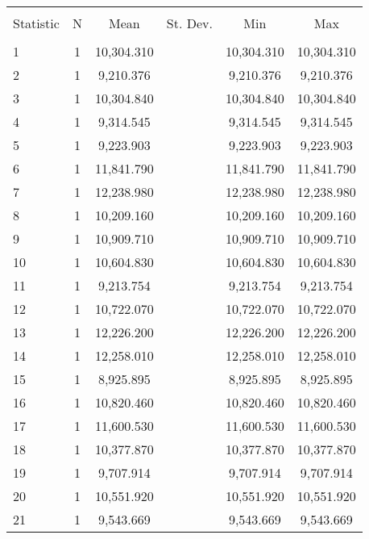 
\begin{table}[!htbp] \centering 
  \caption{} 
  \label{} 
\begin{tabular}{@{\extracolsep{5pt}}lccccc} 
\\[-1.8ex]\hline 
\hline \\[-1.8ex] 
Statistic & \multicolumn{1}{c}{N} & \multicolumn{1}{c}{Mean} & \multicolumn{1}{c}{St. Dev.} & \multicolumn{1}{c}{Min} & \multicolumn{1}{c}{Max} \\ 
\hline \\[-1.8ex] 
1 & 1 & 10,304.310 &  & 10,304.310 & 10,304.310 \\ 
2 & 1 & 9,210.376 &  & 9,210.376 & 9,210.376 \\ 
3 & 1 & 10,304.840 &  & 10,304.840 & 10,304.840 \\ 
4 & 1 & 9,314.545 &  & 9,314.545 & 9,314.545 \\ 
5 & 1 & 9,223.903 &  & 9,223.903 & 9,223.903 \\ 
6 & 1 & 11,841.790 &  & 11,841.790 & 11,841.790 \\ 
7 & 1 & 12,238.980 &  & 12,238.980 & 12,238.980 \\ 
8 & 1 & 10,209.160 &  & 10,209.160 & 10,209.160 \\ 
9 & 1 & 10,909.710 &  & 10,909.710 & 10,909.710 \\ 
10 & 1 & 10,604.830 &  & 10,604.830 & 10,604.830 \\ 
11 & 1 & 9,213.754 &  & 9,213.754 & 9,213.754 \\ 
12 & 1 & 10,722.070 &  & 10,722.070 & 10,722.070 \\ 
13 & 1 & 12,226.200 &  & 12,226.200 & 12,226.200 \\ 
14 & 1 & 12,258.010 &  & 12,258.010 & 12,258.010 \\ 
15 & 1 & 8,925.895 &  & 8,925.895 & 8,925.895 \\ 
16 & 1 & 10,820.460 &  & 10,820.460 & 10,820.460 \\ 
17 & 1 & 11,600.530 &  & 11,600.530 & 11,600.530 \\ 
18 & 1 & 10,377.870 &  & 10,377.870 & 10,377.870 \\ 
19 & 1 & 9,707.914 &  & 9,707.914 & 9,707.914 \\ 
20 & 1 & 10,551.920 &  & 10,551.920 & 10,551.920 \\ 
21 & 1 & 9,543.669 &  & 9,543.669 & 9,543.669 \\ 

\end{tabular}
\end{table}
